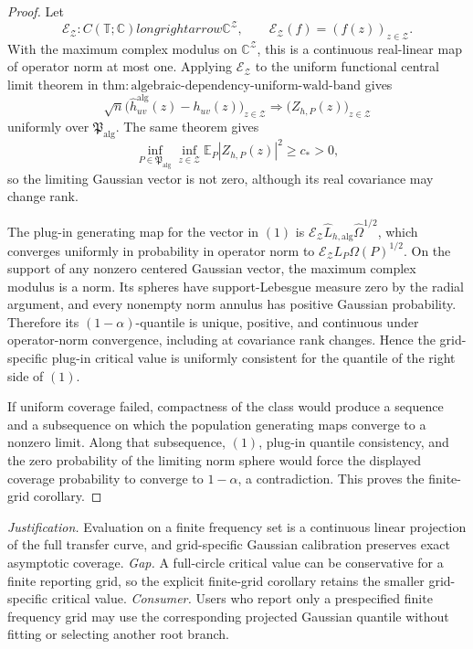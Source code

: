 \documentclass{article}
\begin{document}
\begin{proof}
Let
\[
 \mathcal E_{\mathcal Z}:C(\mathbb T;\mathbb C)longrightarrow\mathbb C^{\mathcal Z},
 \qquad
 \mathcal E_{\mathcal Z}(f)=(f(z))_{z\in\mathcal Z}.
\]
With the maximum complex modulus on \(\mathbb C^{\mathcal Z}\), this is a continuous real-linear map of operator norm at most one.  Applying \(\mathcal E_{\mathcal Z}\) to the uniform functional central limit theorem in \(\mathrm{thm{:}algebraic\mbox{-}dependency\mbox{-}uniform\mbox{-}wald\mbox{-}band}\) gives
\[
 \sqrt n\bigl(\widehat h_{uv}^{\mathrm{alg}}(z)-h_{uv}(z)\bigr)_{z\in\mathcal Z}
 \Longrightarrow
 \bigl(Z_{h,P}(z)\bigr)_{z\in\mathcal Z}
\tag{1}
\]
uniformly over \(\mathfrak P_{\mathrm{alg}}\).  The same theorem gives
\[
 \inf_{P\in\mathfrak P_{\mathrm{alg}}}
 \inf_{z\in\mathcal Z}\mathbb E_P|Z_{h,P}(z)|^2\ge c_*>0,
\tag{2}
\]
so the limiting Gaussian vector is not zero, although its real covariance may change rank.

The plug-in generating map for the vector in \((1)\) is \(\mathcal E_{\mathcal Z}\widehat L_{h,\mathrm{alg}}\widehat\Omega^{1/2}\), which converges uniformly in probability in operator norm to \(\mathcal E_{\mathcal Z}L_P\Omega(P)^{1/2}\).  On the support of any nonzero centered Gaussian vector, the maximum complex modulus is a norm.  Its spheres have support-Lebesgue measure zero by the radial argument, and every nonempty norm annulus has positive Gaussian probability.  Therefore its \((1-\alpha)\)-quantile is unique, positive, and continuous under operator-norm convergence, including at covariance rank changes.  Hence the grid-specific plug-in critical value is uniformly consistent for the quantile of the right side of \((1)\).

If uniform coverage failed, compactness of the class would produce a sequence and a subsequence on which the population generating maps converge to a nonzero limit.  Along that subsequence, \((1)\), plug-in quantile consistency, and the zero probability of the limiting norm sphere would force the displayed coverage probability to converge to \(1-\alpha\), a contradiction.  This proves the finite-grid corollary.
\end{proof}
\par\smallskip\noindent \textit{Justification.} Evaluation on a finite frequency set is a continuous linear projection of the full transfer curve, and grid-specific Gaussian calibration preserves exact asymptotic coverage. \textit{Gap.} A full-circle critical value can be conservative for a finite reporting grid, so the explicit finite-grid corollary retains the smaller grid-specific critical value. \textit{Consumer.} Users who report only a prespecified finite frequency grid may use the corresponding projected Gaussian quantile without fitting or selecting another root branch.
\end{document}
